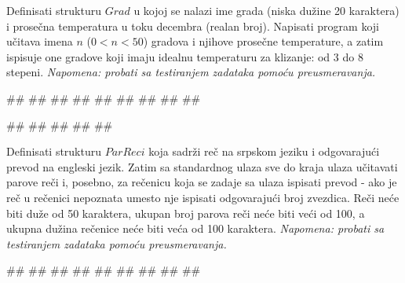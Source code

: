 \begin{Exercise}[label=p2.5_05] 
  Definisati strukturu $Grad$ u kojoj se nalazi ime grada (niska dužine 20 karaktera) i prosečna temperatura u toku decembra (realan broj). Napisati program koji učitava imena $n$ ($0<n<50$) gradova i njihove prosečne temperature, a zatim ispisuje one gradove koji imaju idealnu temperaturu za klizanje: od 3 do 8 stepeni. \textit{Napomena: probati sa testiranjem zadataka pomoću preusmeravanja.}\\
\begin{maxitest}
\begin{upotreba}{1}
#\naslovInt#
##
##
##
##
##
##
##
##
\end{upotreba}
\end{maxitest}

\begin{maxitest}
\begin{upotreba}{2}
#\naslovInt#
##
##
##
##
\end{upotreba}
\end{maxitest}
 

\end{Exercise}
\begin{Answer}[ref=p2.5_05]
\end{Answer}

\begin{Exercise}[label=p2.5_06] 
 Definisati strukturu $ParReci$ koja sadrži reč na srpskom jeziku i odgovarajući prevod na engleski jezik. Zatim sa standardnog ulaza sve do kraja ulaza učitavati parove reči i, posebno, za rečenicu koja se zadaje sa ulaza ispisati prevod - ako je reč u rečenici nepoznata umesto nje ispisati odgovarajući broj zvezdica. Reči neće biti duže od 50 karaktera, ukupan broj parova reči neće biti veći od 100, a ukupna dužina rečenice neće biti veća od 100 karaktera. \textit{Napomena: probati sa testiranjem zadataka pomoću preusmeravanja.}\\
\begin{miditest}
\begin{upotreba}{1}
#\naslovInt#
##
##
##
##
##
##
##
##
\end{upotreba}
\end{miditest}
\end{Exercise}
\begin{Answer}[ref=p2.5_06]
\end{Answer}

